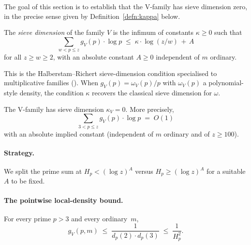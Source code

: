 The goal of this section is to establish that the V-family has sieve
dimension zero, in the precise sense given by
Definition~\ref{defn:kappa} below.

\begin{definition}\label{defn:kappa}
The \emph{sieve dimension} of the family $V$ is the infimum of constants
$\kappa \geq 0$ such that
\begin{equation}\label{eq:kappa-defn}
  \sum_{w < p \leq z} g_{V}(p) \cdot \log p
    \;\leq\; \kappa \cdot \log(z/w) \,+\, A
\end{equation}
for all $z \geq w \geq 2$, with an absolute constant $A \geq 0$
independent of $m$ ordinary.
\end{definition}

This is the Halberstam--Richert sieve-dimension condition specialised to
multiplicative families
(\cite[\S5.2 and \S9, eq.\ (9.2)]{HalberstamRichert1974}). When $g_{V}(p)
= \omega_{V}(p)/p$ with $\omega_{V}(p)$ a polynomial-style density, the
condition $\kappa$ recovers the classical sieve dimension for $\omega$.

\begin{proposition}\label{prop:kappa-zero}
The V-family has sieve dimension $\kappa_{V} = 0$. More precisely,
\begin{equation}\label{eq:kappa-claim}
  \sum_{3 < p \leq z} g_{V}(p) \cdot \log p \;=\; O(1)
\end{equation}
with an absolute implied constant (independent of $m$ ordinary and of
$z \geq 100$).
\end{proposition}

\paragraph{Strategy.}
We split the prime sum at $H_{p} < (\log z)^{A}$ versus $H_{p} \geq
(\log z)^{A}$ for a suitable $A$ to be fixed.

\paragraph{The pointwise local-density bound.}

\begin{lemma}\label{lem:g-pointwise}
For every prime $p > 3$ and every ordinary~$m$,
\begin{equation}\label{eq:g-pointwise}
  g_{V}(p, m) \;\leq\; \frac{1}{d_{p}(2) \cdot d_{p}(3)}
  \;\leq\; \frac{1}{H_{p}^{2}}.
\end{equation}
\end{lemma}

